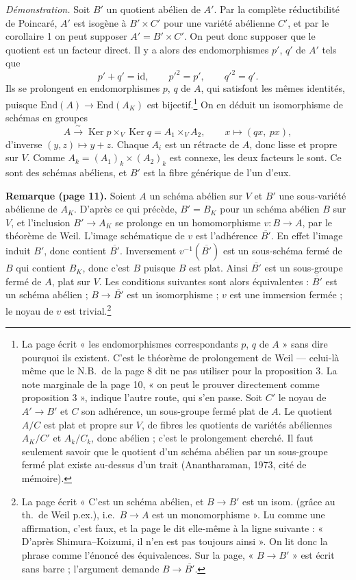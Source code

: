 \documentclass[11pt,a4paper]{article}
\begin{document}
\emph{Démonstration.} Soit $B'$ un quotient abélien de $A'$. Par la complète
réductibilité de Poincaré, $A'$ est isogène à $B' \times C'$ pour une variété
abélienne $C'$, et par le corollaire 1 on peut supposer
$A' = B' \times C'$. On peut donc supposer que le quotient est un facteur
direct. Il y a alors des endomorphismes $p'$, $q'$ de $A'$ tels que
\[
  p' + q' = \mathrm{id}, \qquad p'^{2} = p', \qquad q'^{2} = q'.
\]
Ils se prolongent en endomorphismes $p$, $q$ de $A$, qui satisfont les mêmes
identités, puisque $\mathrm{End}(A) \to \mathrm{End}(A_K)$ est
bijectif.\footnote{La page écrit « les endomorphismes correspondants $p$, $q$
de $A$ » sans dire pourquoi ils existent. C'est le théorème de prolongement de
Weil --- celui-là même que le N.B.\ de la page 8 dit ne pas utiliser pour la
proposition 3. La note marginale de la page 10, « on peut le prouver
directement comme proposition 3 », indique l'autre route, qui s'en passe.
Soit $C'$ le noyau de $A' \to B'$ et $C$ son adhérence, un sous-groupe fermé
plat de $A$. Le quotient $A/C$ est plat et propre sur $V$, de fibres les
quotients de variétés abéliennes $A_K/C'$ et $A_k/C_k$, donc abélien ; c'est le
prolongement cherché. Il faut seulement savoir que le quotient d'un schéma
abélien par un sous-groupe fermé plat existe au-dessus d'un trait
(Anantharaman, 1973, cité de mémoire).} On en déduit un isomorphisme de
schémas en groupes
\[
  A \xrightarrow{\ \sim\ } \operatorname{Ker} p \times_V \operatorname{Ker} q
  = A_1 \times_V A_2, \qquad x \mapsto (q x,\ p x),
\]
d'inverse $(y, z) \mapsto y + z$. Chaque $A_i$ est un rétracte de $A$, donc
lisse et propre sur $V$. Comme $A_k = (A_1)_k \times (A_2)_k$ est connexe, les
deux facteurs le sont. Ce sont des schémas abéliens, et $B'$ est la fibre
générique de l'un d'eux.

\textbf{Remarque (page 11).} Soient $A$ un schéma abélien sur $V$ et $B'$ une
sous-variété abélienne de $A_K$. D'après ce qui précède, $B' = B_K$ pour un
schéma abélien $B$ sur $V$, et l'inclusion $B' \to A_K$ se prolonge en un
homomorphisme $v \colon B \to A$, par le théorème de Weil. L'image
schématique de $v$ est l'adhérence $\overline{B'}$. En effet l'image induit
$B'$, donc contient $\overline{B'}$. Inversement $v^{-1}(\overline{B'})$ est un
sous-schéma fermé de $B$ qui contient $B_K$, donc c'est $B$ puisque $B$ est
plat. Ainsi $\overline{B'}$ est un sous-groupe fermé de $A$, plat sur $V$.
Les conditions suivantes sont alors équivalentes : $\overline{B'}$ est un
schéma abélien ; $B \to \overline{B'}$ est un isomorphisme ; $v$ est une
immersion fermée ; le noyau de $v$ est trivial.\footnote{La page écrit
« C'est un schéma abélien, et $B \to B'$ est un isom. (grâce au th.\ de Weil
p.ex.), i.e.\ $B \to A$ est un monomorphisme ». Lu comme une affirmation, c'est
faux, et la page le dit elle-même à la ligne suivante : « D'après
Shimura--Koizumi, il n'en est pas toujours ainsi ». On lit donc la phrase comme
l'énoncé des équivalences. Sur la page, « $B \to B'$ » est écrit sans barre ;
l'argument demande $B \to \overline{B'}$.}
\end{document}
